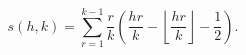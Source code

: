 $$s(h, k) = \sum_{r=1}^{k-1} \frac{r}{k} \left( \frac{hr}{k} - \left\lfloor \frac{hr}{k} \right\rfloor - \frac{1}{2} \right).$$
